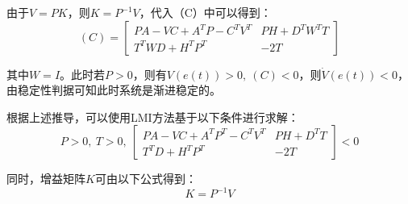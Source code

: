 \documentclass[UTF8]{article}
\begin{document}
由于$V = PK$，则$K = P^{-1}V$，代入（C）中可以得到：
\begin{equation*}
	(C) = \begin{bmatrix}
		PA - VC + A^TP - C^TV^T & PH + D^TW^TT \\
		T^TWD + H^TP^T & -2T
	\end{bmatrix}
\end{equation*}

其中$W = I$。此时若$P > 0$，则有$V(e(t)) > 0,\ (C) < 0$，则$\dot{V}(e(t)) < 0$，由稳定性判据可知此时系统是渐进稳定的。

根据上述推导，可以使用LMI方法基于以下条件进行求解：
\begin{equation*}
	P > 0,\ T > 0,\ 
	\begin{bmatrix}
		PA - VC + A^TP^T - C^TV^T & PH + D^TT \\
		T^TD + H^TP^T & -2T	
	\end{bmatrix} < 0
\end{equation*}

同时，增益矩阵$K$可由以下公式得到：
\begin{equation*}
	K = P^{-1}V
\end{equation*}

\end{document}
